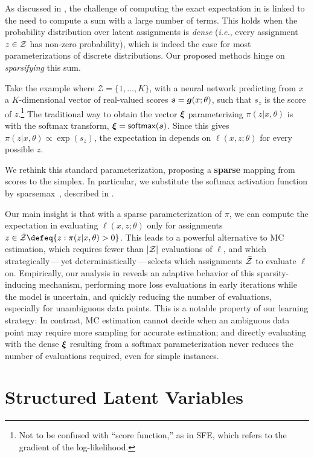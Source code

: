 As discussed in , the challenge of computing the
exact expectation in  is linked to the need to compute
a sum with a large number of terms. This holds when the probability
distribution over latent assignments is {\it dense} ({\it i.e.},
every assignment $z \in \mathcal{Z}$ has non-zero probability), which is
indeed the case for most parameterizations of discrete distributions.
Our proposed methods hinge on {\it sparsifying} this sum.

Take the example where $\mathcal Z = \{1, \ldots, K\}$, with a neural
network predicting from $x$ a $K$-dimensional vector of real-valued
scores $\bm{s} = \bm{g}(x; \theta)$, such that $s_z$ is the score of
$z$.\footnote{Not to be confused with ``score function,'' as in SFE,
    which refers to the gradient of the log-likelihood.} The traditional
way to obtain the vector $\bm{\xi}$ parameterizing $\pi(z|x,\theta)$ is
with the softmax transform, \ie $\bm{\xi} = \operatorname*{\mathsf{softmax}}(\bm{s})$. Since this
gives $\pi(z|x,\theta) \propto \exp(s_z)$, the expectation in
 depends on $\ell(x, z; \theta)$ for every possible
$z$.

We rethink this standard parameterization, proposing a
\textbf{sparse} mapping from scores to the simplex. In particular, we
substitute the softmax activation function by
sparsemax~\citep{sparsemax}, described in
.

Our main insight is that with a sparse parameterization of $\pi$, we
can compute the expectation in  evaluating $\ell(x, z;
    \theta)$ only for assignments $z \in \bar\ZZ \defeq \{z : \pi(z | x,
    \theta) > 0\}$. This leads to a powerful alternative to MC
estimation, which requires fewer than $|\mathcal{Z}|$ evaluations of $\ell$,
and which strategically\,---\,yet deterministically\,---\,selects
which assignments $\bar{\mathcal{Z}}$ to evaluate $\ell$ on. Empirically, our
analysis in  reveals an adaptive behavior of
this sparsity-inducing mechanism, performing more loss evaluations in
early iterations while the model is uncertain, and quickly reducing
the number of evaluations, especially for unambiguous data points.
This is a notable property of our learning strategy: In contrast, MC
estimation cannot decide when an ambiguous data point may require
more sampling for accurate estimation; and directly evaluating
 with the dense $\bm{\xi}$ resulting from a softmax
parameterization never reduces the number of evaluations required,
even for simple instances.

\section{\label{sec:structured}Structured Latent Variables}

